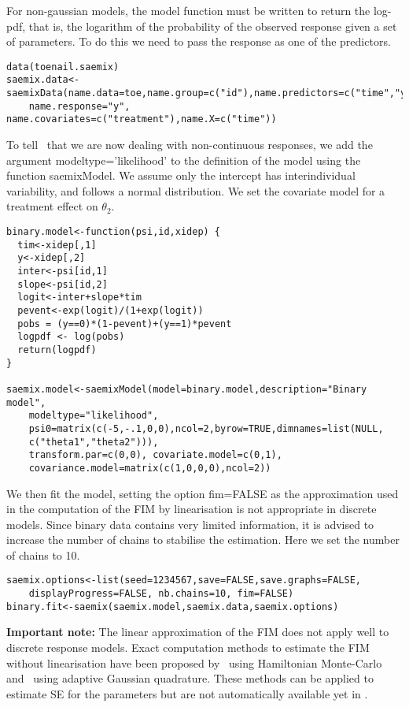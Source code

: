 For non-gaussian models, the model function must be written to return the log-pdf, that is, the logarithm of the probability of the observed response given a set of parameters. To do this we need to pass the response as one of the predictors.
\begin{verbatim}
data(toenail.saemix)
saemix.data<-saemixData(name.data=toe,name.group=c("id"),name.predictors=c("time","y"), 
    name.response="y", name.covariates=c("treatment"),name.X=c("time"))
\end{verbatim}

To tell \monolix~that we are now dealing with non-continuous responses, we add the argument {\sf modeltype='likelihood'} to the definition of the model using the function {\sf saemixModel}. We assume only the intercept has interindividual variability, and follows a normal distribution. We set the covariate model for a treatment effect on $\theta_2$. 
\begin{verbatim}
binary.model<-function(psi,id,xidep) {
  tim<-xidep[,1]
  y<-xidep[,2]
  inter<-psi[id,1]
  slope<-psi[id,2]
  logit<-inter+slope*tim
  pevent<-exp(logit)/(1+exp(logit))
  pobs = (y==0)*(1-pevent)+(y==1)*pevent
  logpdf <- log(pobs)
  return(logpdf)
}

saemix.model<-saemixModel(model=binary.model,description="Binary model",
    modeltype="likelihood",
    psi0=matrix(c(-5,-.1,0,0),ncol=2,byrow=TRUE,dimnames=list(NULL,
    c("theta1","theta2"))),
    transform.par=c(0,0), covariate.model=c(0,1),
    covariance.model=matrix(c(1,0,0,0),ncol=2))
\end{verbatim}

We then fit the model, setting the option {\sf fim=FALSE} as the approximation used in the computation of the FIM by linearisation is not appropriate in discrete models. Since binary data contains very limited information, it is advised to increase the number of chains to stabilise the estimation. Here we set the number of chains to 10.
\begin{verbatim}
saemix.options<-list(seed=1234567,save=FALSE,save.graphs=FALSE, 
    displayProgress=FALSE, nb.chains=10, fim=FALSE)
binary.fit<-saemix(saemix.model,saemix.data,saemix.options)
\end{verbatim}

{\bf Important note:} The linear approximation of the FIM does not apply well to discrete response models. Exact computation methods to estimate the FIM without linearisation have been proposed by~\cite{Riviere16} using Hamiltonian Monte-Carlo and~\cite{Ueckert16} using adaptive Gaussian quadrature. These methods can be applied to estimate SE for the parameters but are not automatically available yet in \monolix.

